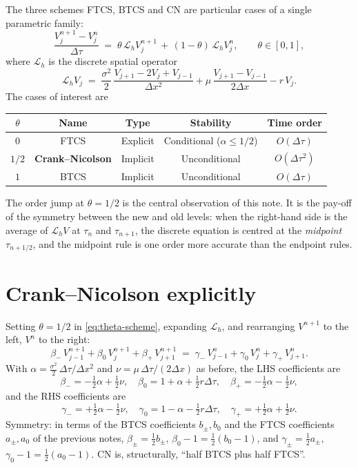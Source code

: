 \documentclass[11pt,a4paper]{article}
\begin{document}
The three schemes FTCS, BTCS and CN are particular cases of a single
parametric family:
\begin{equation}
\frac{V_j^{n+1} - V_j^n}{\Delta\tau}
\;=\;
\theta\,\mathcal{L}_h V_j^{n+1} \,+\, (1-\theta)\,\mathcal{L}_h V_j^n,
\qquad \theta \in [0, 1],
\label{eq:theta-scheme}
\end{equation}
where $\mathcal{L}_h$ is the discrete spatial operator
\[
\mathcal{L}_h V_j
\;=\; \frac{\sigma^2}{2}\,\frac{V_{j+1} - 2V_j + V_{j-1}}{\Delta x^2}
   + \mu\,\frac{V_{j+1} - V_{j-1}}{2\Delta x}
   - r\,V_j.
\]
The cases of interest are
\begin{center}
\begin{tabular}{ccccc}
\hline
$\theta$ & Name & Type & Stability & Time order \\
\hline
$0$    & FTCS & Explicit & Conditional ($\alpha \le 1/2$) & $O(\Delta\tau)$ \\
$1/2$  & \textbf{Crank--Nicolson} & Implicit & Unconditional & $O(\Delta\tau^2)$ \\
$1$    & BTCS & Implicit & Unconditional & $O(\Delta\tau)$ \\
\hline
\end{tabular}
\end{center}
The order jump at $\theta = 1/2$ is the central observation of this
note. It is the pay-off of the symmetry between the new and old
levels: when the right-hand side is the average of $\mathcal{L}_h V$
at $\tau_n$ and $\tau_{n+1}$, the discrete equation is centred at the
\emph{midpoint} $\tau_{n+1/2}$, and the midpoint rule is one order
more accurate than the endpoint rules.

\section{Crank--Nicolson explicitly}

Setting $\theta = 1/2$ in \eqref{eq:theta-scheme}, expanding $\mathcal{L}_h$,
and rearranging $V^{n+1}$ to the left, $V^n$ to the right:
\begin{equation}
\boxed{\;
\beta_-\,V_{j-1}^{n+1} + \beta_0\,V_j^{n+1} + \beta_+\,V_{j+1}^{n+1}
\;=\;
\gamma_-\,V_{j-1}^n + \gamma_0\,V_j^n + \gamma_+\,V_{j+1}^n.
\;}
\label{eq:cn-stencil}
\end{equation}
With $\alpha = \frac{\sigma^2}{2}\,\Delta\tau/\Delta x^2$ and
$\nu = \mu\,\Delta\tau/(2\Delta x)$ as before, the LHS coefficients
are
\[
\beta_- = -\tfrac{1}{2}\alpha + \tfrac{1}{2}\nu, \quad
\beta_0 = 1 + \alpha + \tfrac{1}{2}r\Delta\tau, \quad
\beta_+ = -\tfrac{1}{2}\alpha - \tfrac{1}{2}\nu,
\]
and the RHS coefficients are
\[
\gamma_- = +\tfrac{1}{2}\alpha - \tfrac{1}{2}\nu, \quad
\gamma_0 = 1 - \alpha - \tfrac{1}{2}r\Delta\tau, \quad
\gamma_+ = +\tfrac{1}{2}\alpha + \tfrac{1}{2}\nu.
\]
Symmetry: in terms of the BTCS coefficients $b_\pm, b_0$ and the FTCS
coefficients $a_\pm, a_0$ of the previous notes, $\beta_\pm = \tfrac12 b_\pm$,
$\beta_0 - 1 = \tfrac12(b_0 - 1)$, and $\gamma_\pm = \tfrac12 a_\pm$,
$\gamma_0 - 1 = \tfrac12(a_0 - 1)$.
CN is, structurally, ``half BTCS plus half FTCS''.
\end{document}
